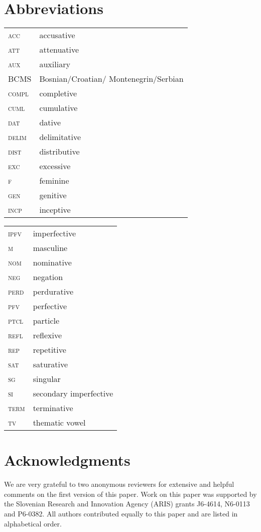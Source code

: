 \documentclass[output=paper,colorlinks,citecolor=brown]{langscibook}
\begin{document}
\section*{Abbreviations}

\begin{tabularx}{.5\textwidth}{@{}lQ}
\textsc{acc}&accusative\\
\textsc{att}&attenuative\\
\textsc{aux}&auxiliary\\
BCMS & Bosnian/Croatian/ Montenegrin/Serbian\\
\textsc{compl}&completive\\
\textsc{cuml}&cumulative\\
\textsc{dat}&dative\\
\textsc{delim}&delimitative\\
\textsc{dist}&distributive\\
\textsc{exc}&excessive\\
\textsc{f}&feminine\\
\textsc{gen}&genitive\\
\textsc{incp}&inceptive\\
\end{tabularx}%
\begin{tabularx}{.5\textwidth}{lQ@{}}
\textsc{ipfv}&imperfective\\
\textsc{m}&masculine\\
\textsc{nom}&nominative\\
\textsc{neg}&negation\\
\textsc{perd}&perdurative\\
\textsc{pfv}&perfective\\
\textsc{ptcl}&particle\\
\textsc{refl}&reflexive\\
\textsc{rep}&repetitive\\
\textsc{sat}&saturative\\
\textsc{sg}&singular\\
\textsc{si} & secondary imperfective\\
\textsc{term}&terminative\\
\textsc{tv}&thematic vowel\\
\end{tabularx}

\section*{Acknowledgments}
We are very grateful to two anonymous reviewers for extensive and helpful comments on the first version of this paper. Work on this paper was supported by the Slovenian Research and Innovation Agency (ARIS) grants J6-4614, N6-0113 and P6-0382. All authors contributed equally to this paper and are listed in alphabetical order.



\printbibliography[heading=subbibliography,notkeyword=this]
\end{document}

